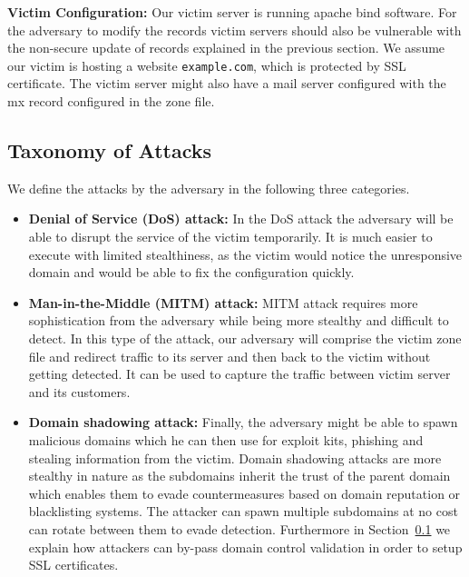 \textbf{Victim Configuration:} Our victim server is running apache bind software. For the adversary to modify the records victim servers should also be vulnerable with the non-secure update of records explained in the previous section. We assume our victim is hosting a website \texttt{example.com}, which is protected by SSL certificate. The victim server might also have a mail server configured with the mx record configured in the zone file.  


\subsection{Taxonomy of Attacks}
We define the attacks by the adversary in the following three categories. 

\begin{itemize}
\item \textbf{Denial of Service (DoS) attack:} In the DoS attack the adversary will be able to disrupt the service of the victim temporarily. It is much easier to execute with limited stealthiness, as the victim would notice the unresponsive domain and would be able to fix the configuration quickly. 


\item \textbf{Man-in-the-Middle (MITM) attack:} MITM attack requires more sophistication from the adversary while being more stealthy and difficult to detect. In this type of the attack, our adversary will comprise the victim zone file and redirect traffic to its server and then back to the victim without getting detected. It can be used to capture the traffic between victim server and its customers.  

\item \textbf{Domain shadowing attack:} Finally, the adversary might be able to spawn malicious domains which he can then use for exploit kits, phishing and stealing information from the victim. Domain shadowing attacks are more stealthy in nature as the subdomains inherit the trust of the parent domain which enables them to evade countermeasures based on domain reputation or blacklisting systems. The attacker can spawn multiple subdomains at no cost can rotate between them to evade detection. Furthermore in Section~\ref{} we explain how attackers can by-pass domain control validation in order to setup SSL certificates. 
\end{itemize}



